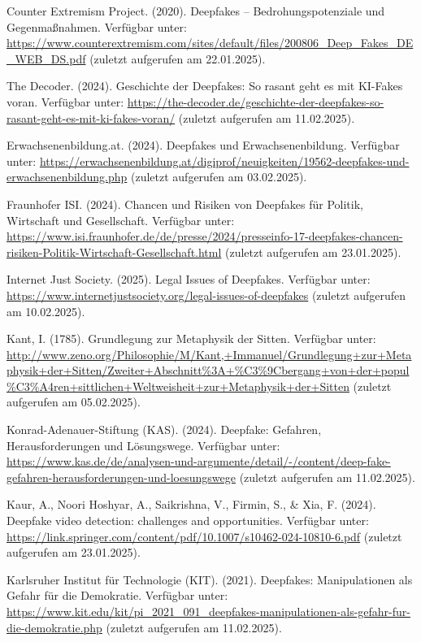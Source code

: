 \documentclass[a4paper,12pt]{article}
\begin{document}
\begin{thebibliography}{99}
 Counter Extremism Project. (2020). Deepfakes – Bedrohungspotenziale und Gegenmaßnahmen.
Verfügbar unter: \url{https://www.counterextremism.com/sites/default/files/200806_Deep_Fakes_DE_WEB_DS.pdf} (zuletzt aufgerufen am 22.01.2025).

 The Decoder. (2024). Geschichte der Deepfakes: So rasant geht es mit KI-Fakes voran.
Verfügbar unter: \url{https://the-decoder.de/geschichte-der-deepfakes-so-rasant-geht-es-mit-ki-fakes-voran/} (zuletzt aufgerufen am 11.02.2025).

 Erwachsenenbildung.at. (2024). Deepfakes und Erwachsenenbildung. 
Verfügbar unter: \url{https://erwachsenenbildung.at/digiprof/neuigkeiten/19562-deepfakes-und-erwachsenenbildung.php} (zuletzt aufgerufen am 03.02.2025).

 Fraunhofer ISI. (2024). Chancen und Risiken von Deepfakes für Politik, Wirtschaft und Gesellschaft. 
Verfügbar unter: \url{https://www.isi.fraunhofer.de/de/presse/2024/presseinfo-17-deepfakes-chancen-risiken-Politik-Wirtschaft-Gesellschaft.html} (zuletzt aufgerufen am 23.01.2025).

 Internet Just Society. (2025). Legal Issues of Deepfakes.
Verfügbar unter: \url{https://www.internetjustsociety.org/legal-issues-of-deepfakes} (zuletzt aufgerufen am 10.02.2025).

 Kant, I. (1785). Grundlegung zur Metaphysik der Sitten.  
Verfügbar unter: \url{http://www.zeno.org/Philosophie/M/Kant,+Immanuel/Grundlegung+zur+Metaphysik+der+Sitten/Zweiter+Abschnitt%3A+%C3%9Cbergang+von+der+popul%C3%A4ren+sittlichen+Weltweisheit+zur+Metaphysik+der+Sitten} (zuletzt aufgerufen am 05.02.2025).

 Konrad-Adenauer-Stiftung (KAS). (2024). Deepfake: Gefahren, Herausforderungen und Lösungswege.
Verfügbar unter: \url{https://www.kas.de/de/analysen-und-argumente/detail/-/content/deep-fake-gefahren-herausforderungen-und-loesungswege} (zuletzt aufgerufen am 11.02.2025).

 Kaur, A., Noori Hoshyar, A., Saikrishna, V., Firmin, S., \& Xia, F. (2024). Deepfake video detection: challenges and opportunities. 
Verfügbar unter: \url{https://link.springer.com/content/pdf/10.1007/s10462-024-10810-6.pdf} (zuletzt aufgerufen am 23.01.2025).

 Karlsruher Institut für Technologie (KIT). (2021). Deepfakes: Manipulationen als Gefahr für die Demokratie.
Verfügbar unter: \url{https://www.kit.edu/kit/pi_2021_091_deepfakes-manipulationen-als-gefahr-fur-die-demokratie.php} (zuletzt aufgerufen am 11.02.2025).


\end{thebibliography}
\end{document}
